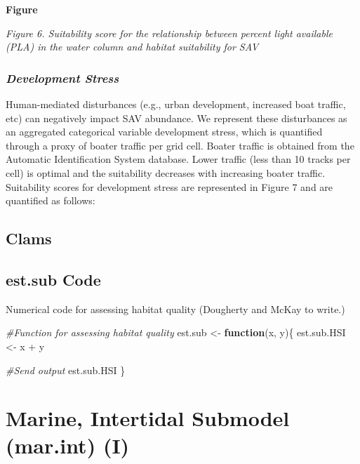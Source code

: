\documentclass[
]{book}
\newenvironment{Shaded}{\begin{snugshade}}{\end{snugshade}}
\newcommand{\CommentTok}[1]{\textcolor[rgb]{0.56,0.35,0.01}{\textit{#1}}}
\newcommand{\ControlFlowTok}[1]{\textcolor[rgb]{0.13,0.29,0.53}{\textbf{#1}}}
\newcommand{\NormalTok}[1]{#1}
\newcommand{\OtherTok}[1]{\textcolor[rgb]{0.56,0.35,0.01}{#1}}
\newcommand{\SpecialCharTok}[1]{\textcolor[rgb]{0.00,0.00,0.00}{#1}}
\begin{document}
\textbf{Figure}

\emph{Figure 6. Suitability score for the relationship between percent light available (PLA) in the water column and habitat suitability for SAV}

\hypertarget{development-stress}{%
\subsubsection{\texorpdfstring{\emph{Development Stress}}{Development Stress}}\label{development-stress}}

Human-mediated disturbances (e.g., urban development, increased boat traffic, etc) can negatively impact SAV abundance. We represent these disturbances as an aggregated categorical variable development stress, which is quantified through a proxy of boater traffic per grid cell. Boater traffic is obtained from the Automatic Identification System database. Lower traffic (less than 10 tracks per cell) is optimal and the suitability decreases with increasing boater traffic. Suitability scores for development stress are represented in Figure 7 and are quantified as follows:

\hypertarget{clams}{%
\subsection{Clams}\label{clams}}

\hypertarget{est.sub-code}{%
\subsection{est.sub Code}\label{est.sub-code}}

Numerical code for assessing habitat quality ({Dougherty and McKay to write.})

\begin{Shaded}
\begin{Highlighting}[]
\CommentTok{\#Function for assessing habitat quality}
\NormalTok{est.sub }\OtherTok{\textless{}{-}} \ControlFlowTok{function}\NormalTok{(x, y)\{}
\NormalTok{  est.sub.HSI }\OtherTok{\textless{}{-}}\NormalTok{ x }\SpecialCharTok{+}\NormalTok{ y}

  \CommentTok{\#Send output}
\NormalTok{  est.sub.HSI}
\NormalTok{\}}
\end{Highlighting}
\end{Shaded}

\hypertarget{marine-intertidal-submodel-mar.int-i}{%
\section{Marine, Intertidal Submodel (mar.int) (I)}\label{marine-intertidal-submodel-mar.int-i}}
\end{document}

